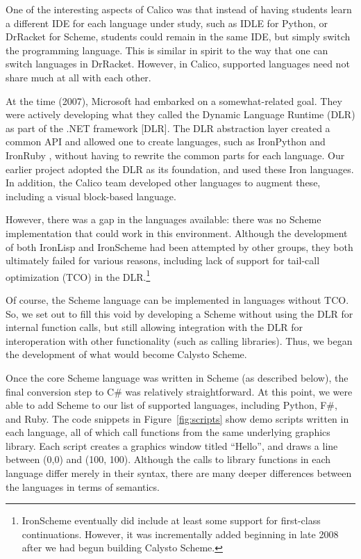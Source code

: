 \documentclass[acmsmall,screen,authorversion]{acmart}
\begin{document}
One of the interesting aspects of Calico was that instead of having
students learn a different IDE for each language under study, such as
IDLE for Python, or DrRacket for Scheme, students could remain in the
same IDE, but simply switch the programming language. This is similar
in spirit to the way that one can switch languages in
DrRacket. However, in Calico, supported languages need not share much
at all with each other.

At the time (2007), Microsoft had embarked on a somewhat-related
goal. They were actively developing what they called the Dynamic
Language Runtime (DLR) as part of the .NET framework [DLR]. The DLR
abstraction layer created a common API and allowed one to create
languages, such as IronPython and IronRuby \cite{IronRuby}, without
having to rewrite the common parts for each language. Our earlier
project adopted the DLR as its foundation, and used these Iron
languages. In addition, the Calico team developed other languages to
augment these, including a visual block-based language.

However, there was a gap in the languages available: there was no
Scheme implementation that could work in this environment. Although
the development of both IronLisp and IronScheme \cite{IronScheme} had
been attempted by other groups, they both ultimately failed for
various reasons, including lack of support for tail-call optimization
(TCO) in the DLR.\footnote[1]{IronScheme eventually did include at
least some support for first-class continuations. However, it was
incrementally added beginning in late 2008
\cite{IronScheme-Continuations} after we had begun building Calysto
Scheme.}

Of course, the Scheme language can be implemented in languages without
TCO. So, we set out to fill this void by developing a Scheme without
using the DLR for internal function calls, but still allowing
integration with the DLR for interoperation with other functionality
(such as calling libraries). Thus, we began the development of what
would become Calysto Scheme.

Once the core Scheme language was written in Scheme (as described below), the
final conversion step to C\# was relatively straightforward. At this point, we
were able to add Scheme to our list of supported languages, including Python,
F\#, and Ruby.  The code snippets in Figure~\ref{fig:scripts} show demo scripts
written in each language, all of which call functions from the same underlying
graphics library. Each script creates a graphics window titled ``Hello'', and
draws a line between (0,0) and (100, 100). Although the calls to library
functions in each language differ merely in their syntax, there are many deeper
differences between the languages in terms of semantics.
\end{document}
